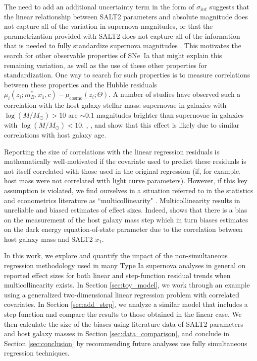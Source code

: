 The need to add an additional uncertainty term in the form of $\sigma_{int}$ suggests that the linear relationship between SALT2 parameters and absolute magnitude does not capture all of the variation in supernova magnitudes, or that the parametrization provided with SALT2 does not capture all of the information that is needed to fully standardize supernova magnitudes \parencite{Saunders2018}. This motivates the search for other observable properties of SNe~Ia that might explain this remaining variation, as well as the use of these other properties for standardization. One way to search for such properties is to measure correlations between these properties and the Hubble residuals $\mu_i(z_i;m_B^*, x_1, c)-\mu_\text{cosmo}(z_i;\Theta)$. A number of studies \parencite{Kelly10, Lampeitl10, Sullivan10, Childress13} have observed such a correlation with the host galaxy stellar mass: supernovae in galaxies with $\log(M/M_\odot) > 10$ are $\sim0.1$ magnitudes brighter than supernovae in galaxies with $\log(M/M_\odot) < 10$. \cite{Rigault13}, \cite{Childress14}, and  \cite{Rigault15} show that this effect is likely due to similar correlations with host galaxy age.

Reporting the size of correlations with the linear regression residuals is mathematically well-motivated if the covariate used to predict these residuals is not itself correlated with those used in the original regression (if, for example, host mass were not correlated with light curve parameters). However, if this key assumption is violated, we find ourselves in a situation referred to in the statistics and econometrics literature as ``multicollinearity" \cite[e.g.][]{Farrar67}. Multicollinearity results in unreliable and biased estimates of effect sizes. Indeed, \cite{Smith20} shows that there is a bias on the measurement of the host galaxy mass step which in turn biases estimates on the dark energy equation-of-state parameter due to the correlation between host galaxy mass and SALT2 $x_1$.

In this work, we explore and quantify the impact of the non-simultaneous regression methodology used in many Type Ia supernova analyses in general on reported effect sizes for both linear and step-function residual trends when multicollinearity exists. In Section \ref{sec:toy_model}, we work through an example using a generalized two-dimensional linear regression problem with correlated covariates. In Section \ref{sec:add_step}, we analyze a similar model that includes a step function and compare the results to those obtained in the linear case. We then calculate the size of the biases using literature data of SALT2 parameters and host galaxy masses in Section \ref{sec:data_comparison}, and conclude in Section \ref{sec:conclusion} by recommending future analyses use fully simultaneous regression techniques.

